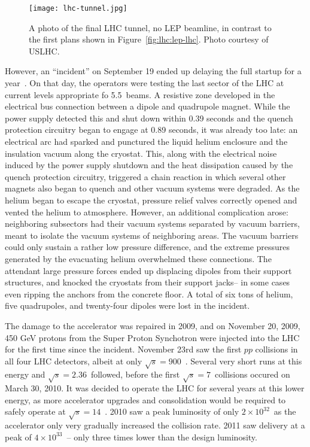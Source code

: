 
\begin{figure}
\centering
\texttt{[image: lhc-tunnel.jpg]}
\label{fig:lhc:lhc-tunnel}
\caption{A photo of the final LHC tunnel, no LEP beamline, in contrast to the first plans shown in Figure~\ref{fig:lhc:lep-lhc}. Photo courtesy of USLHC.}
\end{figure}


However, an ``incident'' on September 19 ended up delaying the full startup for a year~\cite{Incident}. On that day, the operators were testing the last sector of the LHC at current levels appropriate fo 5.5~\TeV beams. A resistive zone developed in the electrical bus connection between a dipole and quadrupole magnet. While the power supply detected this and shut down within 0.39 seconds and the quench protection circuitry began to engage at 0.89 seconds, it was already too late: an electrical arc had sparked and punctured the liquid helium enclosure and the insulation vacuum along the cryostat. This, along with the electrical noise induced by the power supply shutdown and the heat dissipation caused by the quench protection circuitry, triggered a chain reaction in which several other magnets also began to quench and other vacuum systems were degraded. As the helium began to escape the cryostat, pressure relief valves correctly opened and vented the helium to atmosphere. However, an additional complication arose: neighboring subsectors had their vacuum systems separated by vacuum barriers, meant to isolate the vacuum systems of neighboring areas. The vacuum barriers could only sustain a rather low pressure difference, and the extreme pressures generated by the evacuating helium overwhelmed these connections. The attendant large pressure forces ended up displacing dipoles from their support structures, and knocked the cryostats from their support jacks-- in some cases even ripping the anchors from the concrete floor. A total of six tons of helium, five quadrupoles, and twenty-four dipoles were lost in the incident. 

The damage to the accelerator was repaired in 2009, and on November 20, 2009, 450 GeV protons from the Super Proton Synchotron were injected into the LHC for the first time since the incident. November 23rd saw the first $pp$ collisions in all four LHC detectors, albeit at only $\sqrt{s} = 900$~\GeV. Several very short runs at this energy and $\sqrt{s} = 2.36$~\TeV followed, before the first $\sqrt{s} = 7$~\TeV collisions occured on March 30, 2010. It was decided to operate the LHC for several years at this lower energy, as more accelerator upgrades and consolidation would be required to safely operate at $\sqrt{s} = 14$~\TeV. 2010 saw a peak luminosity of only $2\times10^{32}$~\lumirate as the accelerator only very gradually increased the collision rate. 2011 saw delivery at a peak of $4 \times 10^{33}$~\lumirate-- only three times lower than the design luminosity.

